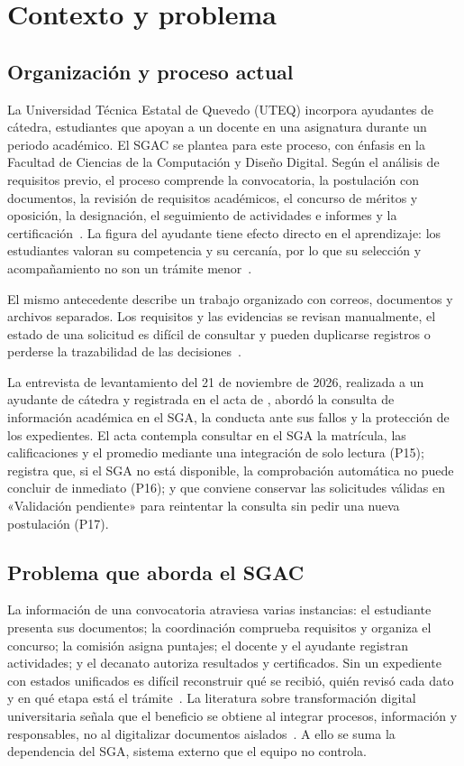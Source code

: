 \section{Contexto y problema}
\label{sec:contexto-problema}

\subsection{Organización y proceso actual}
La Universidad Técnica Estatal de Quevedo (UTEQ) incorpora ayudantes de cátedra, estudiantes que apoyan a un docente en una asignatura durante un periodo académico. El SGAC se plantea para este proceso, con énfasis en la Facultad de Ciencias de la Computación y Diseño Digital. Según el análisis de requisitos previo, el proceso comprende la convocatoria, la postulación con documentos, la revisión de requisitos académicos, el concurso de méritos y oposición, la designación, el seguimiento de actividades e informes y la certificación~\cite{sgacAntecedente}. La figura del ayudante tiene efecto directo en el aprendizaje: los estudiantes valoran su competencia y su cercanía, por lo que su selección y acompañamiento no son un trámite menor~\cite{dillard2024teaching}.

El mismo antecedente describe un trabajo organizado con correos, documentos y archivos separados. Los requisitos y las evidencias se revisan manualmente, el estado de una solicitud es difícil de consultar y pueden duplicarse registros o perderse la trazabilidad de las decisiones~\cite{sgacAntecedente}.

La entrevista de levantamiento del 21 de noviembre de 2026, realizada a un ayudante de cátedra y registrada en el acta de , abordó la consulta de información académica en el SGA, la conducta ante sus fallos y la protección de los expedientes. El acta contempla consultar en el SGA la matrícula, las calificaciones y el promedio mediante una integración de solo lectura (P15); registra que, si el SGA no está disponible, la comprobación automática no puede concluir de inmediato (P16); y que conviene conservar las solicitudes válidas en «Validación pendiente» para reintentar la consulta sin pedir una nueva postulación (P17).

\subsection{Problema que aborda el SGAC}
La información de una convocatoria atraviesa varias instancias: el estudiante presenta sus documentos; la coordinación comprueba requisitos y organiza el concurso; la comisión asigna puntajes; el docente y el ayudante registran actividades; y el decanato autoriza resultados y certificados. Sin un expediente con estados unificados es difícil reconstruir qué se recibió, quién revisó cada dato y en qué etapa está el trámite~\cite{sgacAntecedente}. La literatura sobre transformación digital universitaria señala que el beneficio se obtiene al integrar procesos, información y responsables, no al digitalizar documentos aislados~\cite{fernandez2023digital,souli2025administracion}. A ello se suma la dependencia del SGA, sistema externo que el equipo no controla.

